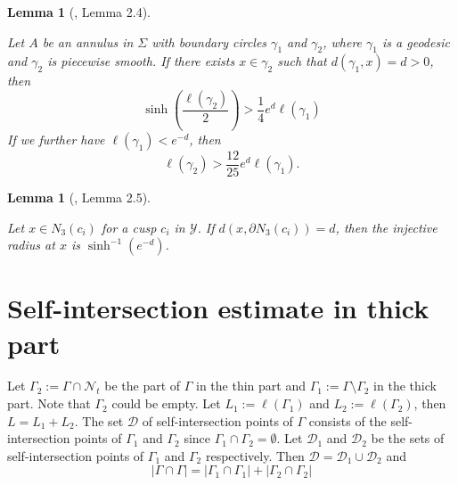 \documentclass[11pt, a4paper]{article}
\newtheorem{lemma}[thm]{Lemma}
\theoremstyle{definition}
\theoremstyle{remark}
\newcommand{\cald}{\mathcal{D}}
\newcommand{\caln}{\mathcal{N}}
\newcommand{\abs}[1]{\left| #1 \right|}
\newcommand{\bracket}[1]{\left( #1 \right)}
\begin{document}
\begin{lemma}[\cite{Y2800}, Lemma 2.4]\label{lemma:injectivity_radius_annulus}

Let $A$ be an annulus in $\Sigma$ with boundary circles $\gamma_1$ and $\gamma_2$, where $\gamma_1$ is a geodesic and $\gamma_2$ is piecewise smooth. If there exists $x\in \gamma_2$ such that $d(\gamma_1, x)=d>0$, then
\begin{equation}
\sinh\bracket{\frac{\ell(\gamma_2)}2}>\frac14 e^d\ell(\gamma_1)
\end{equation}
If we further have $\ell(\gamma_1)<e^{-d}$, then
\begin{equation}
\ell(\gamma_2)>\frac{12}{25}e^{d}\ell(\gamma_1).
\end{equation}
\end{lemma}

\begin{lemma}[\cite{Y2800}, Lemma 2.5]\label{lemma:injectivity_radius_cusp}

Let $x\in{N_3(c_i)}$ for a cusp $c_i$ in $\mathcal{Y}$. If $d(x,\partial{N_3(c_i)})=d$, then the injective radius at $x$ is $\sinh^{-1}(e^{-d})$.
\end{lemma}


\section{Self-intersection estimate in thick part}\label{section3}

Let $\Gamma_2:=\Gamma\cap\caln_t$ be the part of $\Gamma$ in the thin part and $\Gamma_1:=\Gamma\setminus\Gamma_2$ in the thick part. Note that $\Gamma_2$ could be empty. Let $L_1:=\ell(\Gamma_1)$ and $L_2:=\ell(\Gamma_2)$, then $L=L_1+L_2$. The set $\cald$ of self-intersection points of $\Gamma$ consists of the self-intersection points of $\Gamma_1$ and $\Gamma_2$ since $\Gamma_1\cap\Gamma_2=\emptyset$. Let $\cald_1$ and $\cald_2$ be the sets of self-intersection points of $\Gamma_1$ and $\Gamma_2$ respectively. Then $\cald=\cald_1\cup\cald_2$ and
\begin{equation}\label{eqn:split_intersection_number}
\abs{\Gamma\cap\Gamma}=\abs{\Gamma_1\cap\Gamma_1}+\abs{\Gamma_2\cap\Gamma_2}
\end{equation}
\end{document}

